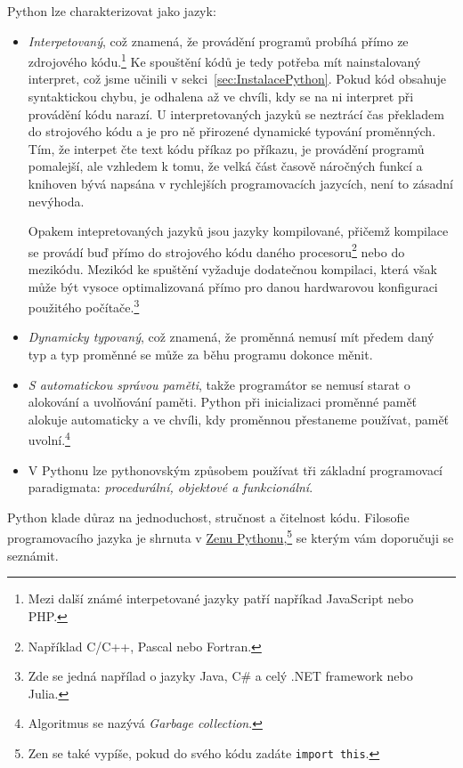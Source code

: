\documentclass[a4paper,11pt,twoside]{article}
\def\code#1{\textnormal{\texttt{#1}}}
\theoremstyle{red}
\theoremstyle{green}
\begin{document}
    Python lze charakterizovat jako jazyk:
    \begin{itemize}
        \item 
            \emph{Interpetovaný}, což znamená, že provádění programů probíhá přímo ze zdrojového kódu.\footnote{
                Mezi další známé interpetované jazyky patří napříkad JavaScript nebo PHP.
            }
            Ke spouštění kódů je tedy potřeba mít nainstalovaný interpret, což jsme učinili v sekci~\ref{sec:InstalacePython}.
            Pokud kód obsahuje syntaktickou chybu, je odhalena až ve chvíli, kdy se na ni interpret při provádění kódu narazí.
            U interpretovaných jazyků se neztrácí čas překladem do strojového kódu a je pro ně přirozené dynamické typování proměnných.
            Tím, že interpet čte text kódu příkaz po příkazu, je provádění programů pomalejší, ale vzhledem k tomu, že velká část časově náročných funkcí a knihoven bývá napsána v rychlejších programovacích jazycích, není to zásadní nevýhoda.
            
            Opakem intepretovaných jazyků jsou jazyky kompilované, přičemž kompilace se provádí buď přímo do strojového kódu daného procesoru\footnote{Například C/C++, Pascal nebo Fortran.} nebo do mezikódu. 
            Mezikód ke spuštění vyžaduje dodatečnou kompilaci, která však může být vysoce optimalizovaná přímo pro danou hardwarovou konfiguraci použitého počítače.\footnote{Zde se jedná napřílad o jazyky Java, C\# a celý .NET framework nebo Julia.}

        \item 
            \emph{Dynamicky typovaný}, což znamená, že proměnná nemusí mít předem daný typ a typ proměnné se může za běhu programu dokonce měnit.
        
        \item 
            \emph{S automatickou správou paměti}, takže programátor se nemusí starat o alokování a uvolňování paměti. 
            Python při inicializaci proměnné paměť alokuje automaticky a ve chvíli, kdy proměnnou přestaneme používat, paměť uvolní.\footnote{Algoritmus se nazývá \emph{Garbage collection}.} 

        \item
            V Pythonu lze pythonovským způsobem používat tři základní programovací paradigmata: \emph{procedurální, objektové a funkcionální}.
    \end{itemize}
         
    Python klade důraz na jednoduchost, stručnost a čitelnost kódu.
    Filosofie programovacího jazyka je shrnuta v \href{https://www.python.org/dev/peps/pep-0020/}{Zenu Pythonu},\footnote{
        Zen se také vypíše, pokud do svého kódu zadáte \code{import this}.
    } se kterým vám doporučuji se seznámit.
\end{document}
